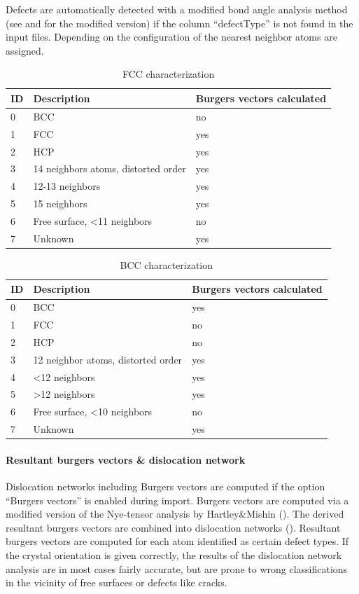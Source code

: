 \documentclass[a4paper,12pt]{scrartcl}
\begin{document}
Defects are automatically detected with a modified bond angle analysis method (see \cite{BAD} and \cite{Begau2011934} for the modified version) if the column ``defectType'' is not found in the input files.
Depending on the configuration of the nearest neighbor atoms are assigned.

\begin{center}
\begin{table}
\caption*{FCC characterization}
\begin{tabular}{l|l|l}
ID & Description & Burgers vectors calculated\\
\hline
0 & BCC & no\\
1&FCC&yes\\
2&HCP&yes\\
3& 14 neighbors atoms, distorted order& yes\\
4& 12-13 neighbors & yes\\
5&15 neighbors&yes\\
6& Free surface, \textless11 neighbors & no\\
7& Unknown&yes\\
\end{tabular}
\end{table}
\end{center}

\begin{center}
\begin{table}
\caption*{BCC characterization}
\begin{tabular}{l|l|l}
ID & Description & Burgers vectors calculated\\
\hline
0 & BCC & yes\\
1&FCC&no\\
2&HCP&no\\
3& 12 neighbor atoms, distorted order & yes\\
4& \textless12 neighbors & yes\\
5&\textgreater12 neighbors&yes\\
6& Free surface, \textless10 neighbors & no\\
7& Unknown&yes\\
\end{tabular}
\end{table}
\end{center}

\paragraph{Resultant burgers vectors \& dislocation network}
Dislocation networks including Burgers vectors are computed if the option ``Burgers vectors'' is enabled during import.
Burgers vectors are computed via a modified version of the Nye-tensor analysis by Hartley\&Mishin (\cite{NyeTensor,NyeTensor2}). The derived resultant burgers vectors are combined into dislocation networks (\cite{Begau2011934}). Resultant burgers vectors are computed for each atom identified as certain defect types. 
If the crystal orientation is given correctly, the results of the dislocation network analysis are in most cases fairly accurate, but are prone to wrong classifications in the vicinity of free surfaces or defects like cracks.
\end{document}
